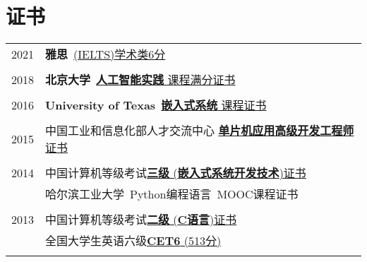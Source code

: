\documentclass[a4paper,10pt]{article} %
\begin{document}
\section{证书}
\begin{tabular}{r|l}	
	


2021                        & \textbf{雅思}\ \href{https://nbviewer.org/github/HuangJiaLian/DataBase0/blob/cd031badd0d3f5841b182a9bf8b0a2daa9b96f84/uPic/2021_12_04_15_IELTS.pdf}{(IELTS)学术类6分}\\
\multicolumn{2}{c}{} \\	%

2018                        & \textbf{北京大学}\ \href{https://nbviewer.org/github/HuangJiaLian/DataBase0/blob/edd29a7b30885820fabc6720dac9bd56c0cb9851/uPic/2021_11_26_10_Peking_AI.png}{\textbf{人工智能实践} 课程满分证书}\\
\multicolumn{2}{c}{} \\	%

2016                        &  \textbf{University of Texas}\ \href{https://nbviewer.org/github/HuangJiaLian/DataBase0/blob/37d6fc3eadd7a5276f030f00b0a618de66df0e78/uPic/2021_11_26_09_UTAustinX_UT.6.03x_Certificate_edX.pdf}{\textbf{嵌入式系统} 课程证书} \\   	
\multicolumn{2}{c}{} \\	%

2015                     & 中国工业和信息化部人才交流中心 \href{https://nbviewer.org/github/HuangJiaLian/DataBase0/blob/f0bbfb6e2f2189b6ae0c43100579b9605faed6a6/uPic/2021_11_26_12_8.png}{\textbf{单片机应用高级开发工程师} 证书}\\
\multicolumn{2}{c}{} \\	%

2014                     & 中国计算机等级考试\href{https://nbviewer.org/github/HuangJiaLian/DataBase0/blob/bffb5248aa974d5a5a0b1b5c9130951158f4f460/uPic/2021_11_26_11_6.png}{\textbf{三级} (\textbf{嵌入式系统开发技术})证书}\\
							& 哈尔滨工业大学\ Python编程语言\ MOOC课程证书\\
\multicolumn{2}{c}{} \\	%

2013                     & 中国计算机等级考试\href{https://nbviewer.org/github/HuangJiaLian/DataBase0/blob/c19c03dbdc866420984cbe97a48893b40c02fa78/uPic/2021_11_26_11_5.png}{\textbf{二级} (\textbf{C语言})证书}\\
& 全国大学生英语六级\href{https://nbviewer.org/github/HuangJiaLian/DataBase0/blob/fc6547e18e86cdb0584c398827f9f83a50d3c04b/uPic/2021_12_04_15_CET6.pdf}{\textbf{CET6} (513分)}\\ 
\multicolumn{2}{c}{} \\	%
\end{tabular}
\end{document}
